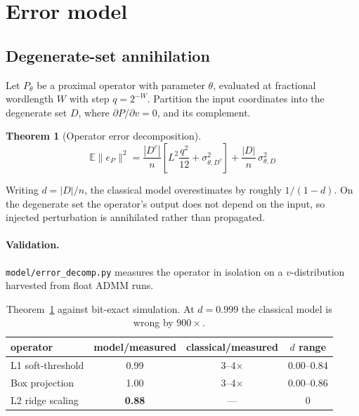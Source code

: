 \documentclass[11pt,a4paper]{article}
\newtheorem{theorem}{Theorem}
\begin{document}
\section{Error model}

\subsection{Degenerate-set annihilation}

Let $P_\theta$ be a proximal operator with parameter $\theta$, evaluated at
fractional wordlength $W$ with step $q = 2^{-W}$. Partition the input
coordinates into the degenerate set $D$, where $\partial P/\partial v = 0$, and
its complement.

\begin{theorem}[Operator error decomposition]
\label{thm:t1}
\begin{equation}
\mathbb{E}\lVert e_P \rVert^2 =
  \frac{|D^c|}{n}\left[L^2\frac{q^2}{12} + \sigma^2_{\theta,D^c}\right]
+ \frac{|D|}{n}\,\sigma^2_{\theta,D}
\end{equation}
\end{theorem}

Writing $d = |D|/n$, the classical model overestimates by roughly $1/(1-d)$.
On the degenerate set the operator's output does not depend on the input, so
injected perturbation is annihilated rather than propagated.

\paragraph{Validation.} \texttt{model/error\_decomp.py} measures the operator
in isolation on a $v$-distribution harvested from float ADMM runs.

\begin{table}[h]\centering
\begin{tabular}{lccc}
\toprule
operator & model/measured & classical/measured & $d$ range \\
\midrule
L1 soft-threshold & 0.99 & 3--4$\times$ & 0.00--0.84 \\
Box projection    & 1.00 & 3--4$\times$ & 0.00--0.86 \\
L2 ridge scaling  & \textbf{0.88} & --- & 0 \\
\bottomrule
\end{tabular}
\caption{Theorem~\ref{thm:t1} against bit-exact simulation. At $d = 0.999$ the
classical model is wrong by $900\times$.}
\end{table}
\end{document}

